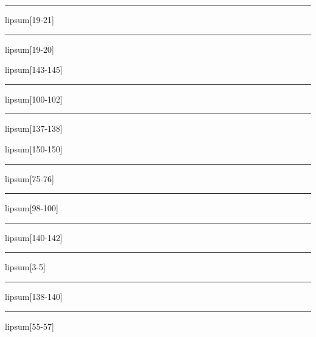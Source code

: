 \documentclass[11pt,a4paper]{article}
\begin{document}
\begin{simplewrap}
  \textcolor{yellow!53}{\rule{4.3cm}{2.8cm}}
\end{simplewrap}
lipsum[19-21]

\begin{simplewrap}
  \textcolor{purple!11}{\rule{4.4cm}{4.7cm}}
\end{simplewrap}
lipsum[19-20]

lipsum[143-145]

\begin{simplewrap}
  \textcolor{green!46}{\rule{5.5cm}{9.3cm}}
\end{simplewrap}
lipsum[100-102]

\begin{simplewrap}
  \textcolor{pink!37}{\rule{3.9cm}{5.1cm}}
\end{simplewrap}
lipsum[137-138]

lipsum[150-150]

\begin{simplewrap}
  \textcolor{blue!54}{\rule{5.5cm}{4.9cm}}
\end{simplewrap}
lipsum[75-76]

\begin{simplewrap}
  \textcolor{violet!48}{\rule{3.3cm}{8.1cm}}
\end{simplewrap}
lipsum[98-100]

\begin{simplewrap}
  \textcolor{red!40}{\rule{3.5cm}{3.8cm}}
\end{simplewrap}
lipsum[140-142]

\begin{simplewrap}
  \textcolor{purple!29}{\rule{5.0cm}{9.3cm}}
\end{simplewrap}
lipsum[3-5]

\begin{simplewrap}
  \textcolor{magenta!19}{\rule{3.4cm}{2.0cm}}
\end{simplewrap}
lipsum[138-140]

\begin{simplewrap}
  \textcolor{green!29}{\rule{3.6cm}{7.9cm}}
\end{simplewrap}
lipsum[55-57]
\end{document}
